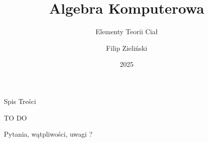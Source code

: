 \documentclass{beamer}
\title{Algebra Komputerowa}
\subtitle{Elementy Teorii Ciał}
\author{Filip Zieli\'nski}
\date{2025}
\begin{document}
\begin{frame}
    \titlepage
\end{frame}
 
\begin{frame}{Spis Treści}
    \tableofcontents
\end{frame}
\begin{frame}
    \LARGE TO DO 
\end{frame}
\begin{frame}
    \centering 
    \LARGE Pytania, wątpliwości, uwagi ? 
\end{frame}
\end{document}
